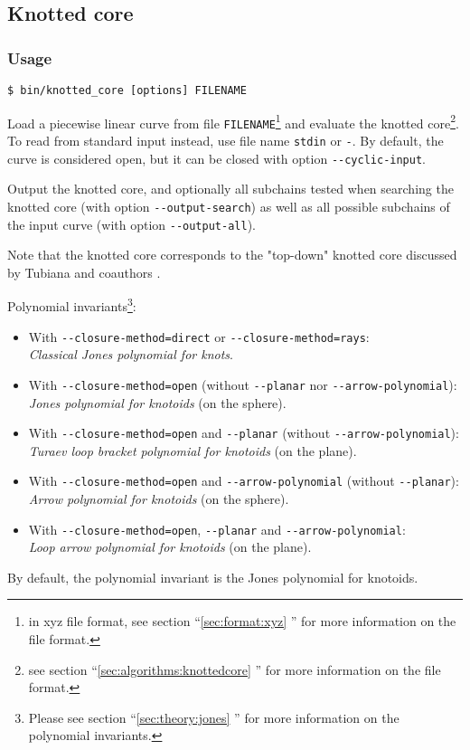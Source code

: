       
\subsection{Knotted core}
\subsubsection{Usage}
\begin{lstlisting}
$ bin/knotted_core [options] FILENAME
\end{lstlisting}

Load a piecewise linear curve from file  \lstinline{FILENAME}\footnote{in xyz file format, see section ``\ref{sec:format:xyz} ''  for more information on the file format.} and evaluate the knotted core\footnote{see section  ``\ref{sec:algorithms:knottedcore} '' for more information on the file format.}.
To read from standard input instead, use file name \lstinline{stdin} or \lstinline{-}.
By default, the curve is considered open, but it can be closed with option \lstinline{--cyclic-input}.

Output the knotted core,  and optionally all subchains tested when searching the knotted core (with option \lstinline{--output-search}) as well as all possible subchains of the input curve (with option \lstinline{--output-all}).

Note that the knotted core corresponds to the "top-down" knotted core discussed by Tubiana and coauthors \cite{tubiana2011}.

Polynomial invariants\footnote{Please see section ``\ref{sec:theory:jones} '' for more information on the polynomial invariants.}:
\begin{itemize}
\item With \lstinline{--closure-method=direct} or  \lstinline{--closure-method=rays}:\\
  \emph{Classical Jones polynomial for knots}\cite{jones}.
\item With \lstinline{--closure-method=open} (without \lstinline{--planar} nor \lstinline{--arrow-polynomial}):\\
  \emph{Jones polynomial for knotoids} (on the sphere)\cite{turaev,guka}.
\item With \lstinline{--closure-method=open} and  \lstinline{--planar} (without \lstinline{--arrow-polynomial}):\\
  \emph{Turaev loop bracket polynomial for knotoids} (on the plane)\cite{turaev}.
\item With \lstinline{--closure-method=open} and \lstinline{--arrow-polynomial} (without \lstinline{--planar}):\\
  \emph{Arrow polynomial for knotoids} (on the sphere)\cite{guka,dye2009}.
\item With \lstinline{--closure-method=open}, \lstinline{--planar} and \lstinline{--arrow-polynomial}:\\
  \emph{Loop arrow polynomial for knotoids} (on the plane)\cite{gound2}.
\end{itemize}
By default, the polynomial invariant is the Jones polynomial for knotoids.

